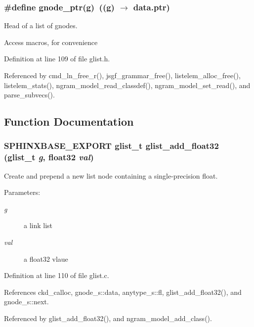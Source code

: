 \subsubsection[{gnode\_\-ptr}]{\setlength{\rightskip}{0pt plus 5cm}\#define gnode\_\-ptr(g)~((g) $\rightarrow$ data.ptr)}\label{glist_8h_ce56682f14d84cc456c805d26fd86734}


Head of a list of gnodes. 

Access macros, for convenience 

Definition at line 109 of file glist.h.

Referenced by cmd\_\-ln\_\-free\_\-r(), jsgf\_\-grammar\_\-free(), listelem\_\-alloc\_\-free(), listelem\_\-stats(), ngram\_\-model\_\-read\_\-classdef(), ngram\_\-model\_\-set\_\-read(), and parse\_\-subvecs().

\subsection{Function Documentation}
\subsubsection[{glist\_\-add\_\-float32}]{\setlength{\rightskip}{0pt plus 5cm}SPHINXBASE\_\-EXPORT {\bf glist\_\-t} glist\_\-add\_\-float32 ({\bf glist\_\-t} {\em g}, \/  float32 {\em val})}\label{glist_8h_4fc4db2fbebd7b659554227d411f6737}


Create and prepend a new list node containing a single-precision float. 

\begin{Desc}
\item[Parameters: ]\par
\begin{description}
\item[{\em 
g}]a link list \item[{\em 
val}]a float32 vlaue \end{description}
\end{Desc}


Definition at line 110 of file glist.c.

References ckd\_\-calloc, gnode\_\-s::data, anytype\_\-s::fl, glist\_\-add\_\-float32(), and gnode\_\-s::next.

Referenced by glist\_\-add\_\-float32(), and ngram\_\-model\_\-add\_\-class().
